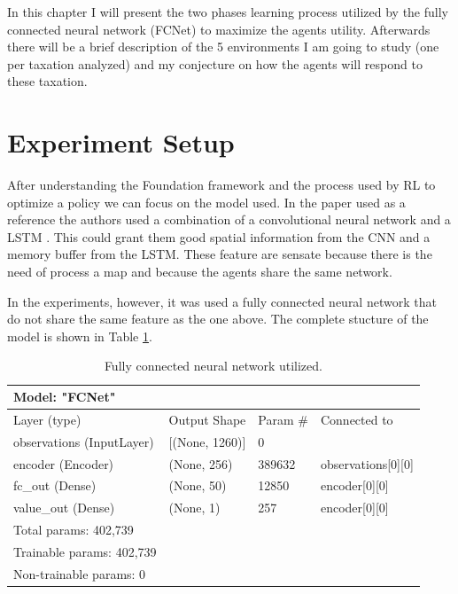 In this chapter I will present the two phases learning process utilized by the fully connected neural network (FCNet) to maximize the agents utility. Afterwards there will be a brief description of the 5 environments I am going to study (one per taxation analyzed) and my conjecture on how the agents will respond to these taxation.


\section{Experiment Setup}

After understanding the Foundation framework and the process used by RL to optimize a policy we can focus on the model used. In the paper used as a reference the authors used a combination of a convolutional neural network and a LSTM \cite{zheng2020ai}. This could grant them good spatial information from the CNN and a memory buffer from the LSTM. These feature are sensate because there is the need of process a map and because the agents share the same network.

In the experiments, however, it was used a fully connected neural network that do not share the same feature as the one above. The complete stucture of the model is shown in Table \ref{tab:Fcnet}. 


\begin{table}[h!]
    \begin{tabular}{llll}
	Model: "FCNet"            &                    &          &                            \\ \hline
	Layer (type)              & Output Shape       & Param \# & Connected to               \\ \hline
	observations (InputLayer) & {[}(None, 1260){]} & 0        &                            \\ \hline
	encoder (Encoder)         & (None, 256)        & 389632   & observations{[}0{]}{[}0{]} \\ \hline
	fc\_out (Dense)           & (None, 50)         & 12850    & encoder{[}0{]}{[}0{]}      \\ \hline
	value\_out (Dense)        & (None, 1)          & 257      & encoder{[}0{]}{[}0{]}      \\ \hline
	Total params: 402,739     &                    &          &                            \\
	Trainable params: 402,739 &                    &          &                            \\
	Non-trainable params: 0   &                    &          &                            \\ \hline
    \end{tabular}
    \caption{\label{tab:Fcnet} Fully connected neural network utilized.}
\end{table}


